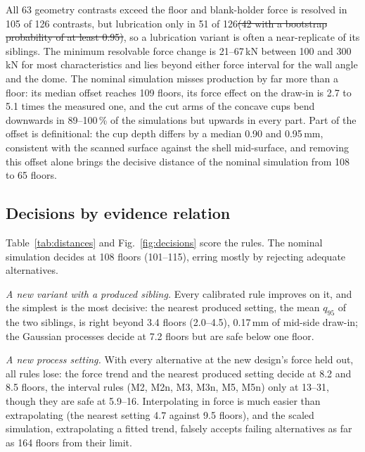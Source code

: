 \documentclass[pdflatex,sn-basic,lineno]{sn-jnl}
\providecommand{\DIFdel}[1]{{\protect\color{red}\sout{#1}}}                      %
\providecommand{\DIFdelbegin}{} %
\providecommand{\DIFdelend}{} %
\newcommand{\DIFscaledelfig}{0.5}
\newlength{\DIFdelgraphicswidth} %
\newlength{\DIFdelgraphicsheight} %
\newcommand{\DIFdelincludegraphics}[2][]{%
\sbox{\DIFdelgraphicsbox}{\DIFOincludegraphics[#1]{#2}}%
\settoboxwidth{\DIFdelgraphicswidth}{\DIFdelgraphicsbox} %
\settoboxtotalheight{\DIFdelgraphicsheight}{\DIFdelgraphicsbox} %
\scalebox{\DIFscaledelfig}{%
\parbox[b]{\DIFdelgraphicswidth}{\usebox{\DIFdelgraphicsbox}\\[-\baselineskip] \rule{\DIFdelgraphicswidth}{0em}}\llap{\resizebox{\DIFdelgraphicswidth}{\DIFdelgraphicsheight}{%
\setlength{\unitlength}{\DIFdelgraphicswidth}%
\begin{picture}(1,1)%
\thicklines\linethickness{2pt} %
{\color[rgb]{1,0,0}\put(0,0){\framebox(1,1){}}}%
{\color[rgb]{1,0,0}\put(0,0){\line( 1,1){1}}}%
{\color[rgb]{1,0,0}\put(0,1){\line(1,-1){1}}}%
\end{picture}%
}\hspace*{3pt}}} %
} %
\DeclareRobustCommand{\DIFdelbegin}{\DIFOdelbegin \let\includegraphics\DIFdelincludegraphics} %
\DeclareRobustCommand{\DIFdelend}{\DIFOaddend \let\includegraphics\DIFOincludegraphics} %
\begin{document}
All 63 geometry contrasts exceed the floor and blank-holder force is resolved in 105 of 126 contrasts, but lubrication only in 51 of 126\DIFdelbegin \DIFdel{(42 with a bootstrap probability of at least 0.95)}\DIFdelend , so a lubrication variant is often a near-replicate of its siblings. The minimum resolvable force change is 21--67\,kN between 100 and 300\,kN for most characteristics and lies beyond either force interval for the wall angle and the dome. The nominal simulation misses production by far more than a floor: its median offset reaches 109 floors, its force effect on the draw-in is 2.7 to 5.1 times the measured one, and the cut arms of the concave cups bend downwards in 89--100\,\% of the simulations but upwards in every part. Part of the offset is definitional: the cup depth differs by a median 0.90 and 0.95\,mm, consistent with the scanned surface against the shell mid-surface, and removing this offset alone brings the decisive distance of the nominal simulation from 108 to 65 floors.

\subsection{Decisions by evidence relation}\label{sec:res-decisions}

Table~\ref{tab:distances} and Fig.~\ref{fig:decisions} score the rules. The nominal simulation decides at 108 floors (101--115), erring mostly by rejecting adequate alternatives.

\emph{A new variant with a produced sibling.} Every calibrated rule improves on it, and the simplest is the most decisive: the nearest produced setting, the mean $q_{95}$ of the two siblings, is right beyond 3.4 floors (2.0--4.5), 0.17\,mm of mid-side draw-in; the Gaussian processes decide at 7.2 floors but are safe below one floor.

\emph{A new process setting.} With every alternative at the new design's force held out, all rules lose: the force trend and the nearest produced setting decide at 8.2 and 8.5 floors, the interval rules (M2, M2n, M3, M3n, M5, M5n) only at 13--31, though they are safe at 5.9--16. Interpolating in force is much easier than extrapolating (the nearest setting 4.7 against 9.5 floors), and the scaled simulation, extrapolating a fitted trend, falsely accepts failing alternatives as far as 164 floors from their limit.
\end{document}
